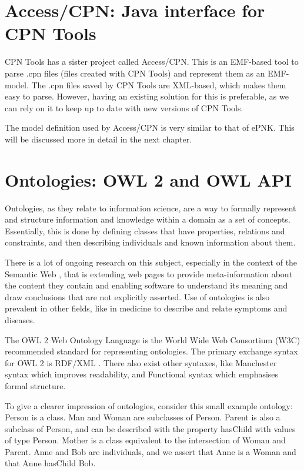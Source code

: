 \section{Access/CPN: Java interface for CPN Tools}
CPN Tools has a sister project called Access/CPN. This is an
EMF-based tool to parse .cpn files (files created with CPN Tools) and represent
them as an EMF-model. The .cpn files saved by CPN Tools are XML-based, which makes them
easy to parse. However, having an existing solution for this is preferable, as
we can rely on it to keep up to date with new versions of CPN Tools.

The model definition used by Access/CPN is very similar to that of ePNK. This
will be discussed more in detail in the next chapter.

\section{Ontologies: OWL 2 and OWL API}\label{sec:ontologies}

Ontologies, as they relate to information science, are a way to formally
represent and structure information and knowledge within a domain as a set of
concepts. Essentially, this is done by defining classes that have properties,
relations and constraints, and then describing individuals and known information
about them. 

There is a lot of ongoing research on this subject, especially in the context of
the Semantic Web \cite{bernerslee2001semantic}, that is extending web pages to
provide meta-information about the content they contain and enabling software to
understand its meaning and draw conclusions that are not explicitly asserted.
Use of ontologies is also prevalent in other fields, like in medicine to
describe and relate symptoms and diseases.

The OWL 2 Web Ontology Language \cite{owl2-overview} is the World Wide Web
Consortium (W3C) recommended standard for representing ontologies.  The primary
exchange syntax for OWL 2 is RDF/XML \cite{rdf-xml}. There also exist
other syntaxes, like Manchester syntax which improves readability, and
Functional syntax which emphasises formal structure.

To give a clearer impression of ontologies, consider this small example
ontology:
Person is a class. Man and Woman are subclasses of Person. Parent is also a
subclass of Person, and can be described with the property hasChild with values
of type Person. Mother is a class equivalent to the intersection of Woman and
Parent. Anne and Bob are individuals, and we assert that Anne is
a Woman and that Anne hasChild Bob.

